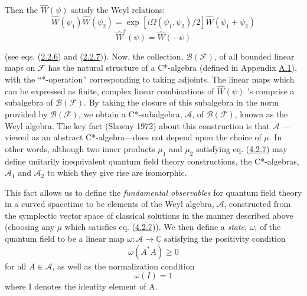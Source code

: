 \documentclass[11pt,a4paper]{article}
\begin{document}
Then the \(\hat{W}(\psi)\) satisfy the Weyl relations:
\begin{equation*}
\hat{W}(\psi_1) \hat{W}(\psi_2) = \exp[i\Omega(\psi_1, \psi_2)/2] \hat{W}(\psi_1 + \psi_2) \tag{4.5.2}\label{eq:4.5.2}
\end{equation*}
\begin{equation*}
\hat{W}^{\dagger}(\psi) = \hat{W}(-\psi) \tag{4.5.3}\label{eq:4.5.3}
\end{equation*}

\hypertarget{source-87}{}

(see eqs. (\hyperref[eq:2.2.6]{2.2.6}) and (\hyperref[eq:2.2.7]{2.2.7})). Now, the collection, \(\mathcal{B}(\mathcal{F})\), of all bounded linear maps on \(\mathcal{F}\) has the natural structure of a C*-algebra (defined in Appendix \hyperlink{sec:A.1}{A.1}), with the ``*-operation'' corresponding to taking adjoints. The linear maps which can be expressed as finite, complex linear combinations of \(\hat{W}(\psi)\) 's comprise a subalgebra of \(\mathcal{B}(\mathcal{F})\). By taking the closure of this subalgebra in the norm provided by \(\mathcal{B}(\mathcal{F})\), we obtain a C*-subalgebra, \(\mathcal{A}\), of \(\mathcal{B}(\mathcal{F})\), known as the Weyl algebra. The key fact (Slawny 1972) about this construction is that \(\mathcal{A}\) ---viewed as an abstract C*-algebra---does not depend upon the choice of \(\mu\). In other words, although two inner products \(\mu_1\) and \(\mu_2\) satisfying eq. (\hyperref[eq:4.2.7]{4.2.7}) may define unitarily inequivalent quantum field theory constructions, the C*-algebras, \(\mathcal{A}_1\) and \(\mathcal{A}_2\) to which they give rise are isomorphic.

This fact allows us to define the \emph{fundamental observables} for quantum field theory in a curved spacetime to be elements of the Weyl algebra, \(\mathcal{A}\), constructed from the symplectic vector space of classical solutions in the manner described above (choosing any \(\mu\) which satisfies eq. (\hyperref[eq:4.2.7]{4.2.7})). We then define a \emph{state}, \(\omega\), of the quantum field to be a linear map \(\omega \colon \mathcal{A} \to \mathbb{C}\) satisfying the positivity condition
\begin{equation*}
\omega (A^*A) \ge 0 \tag{4.5.4}\label{eq:4.5.4}
\end{equation*}
for all \(A\in\mathcal A\), as well as the normalization condition
\begin{equation*}
\omega(I)=1\tag{4.5.5}\label{eq:4.5.5}
\end{equation*}
where I denotes the identity element of A.
\end{document}
